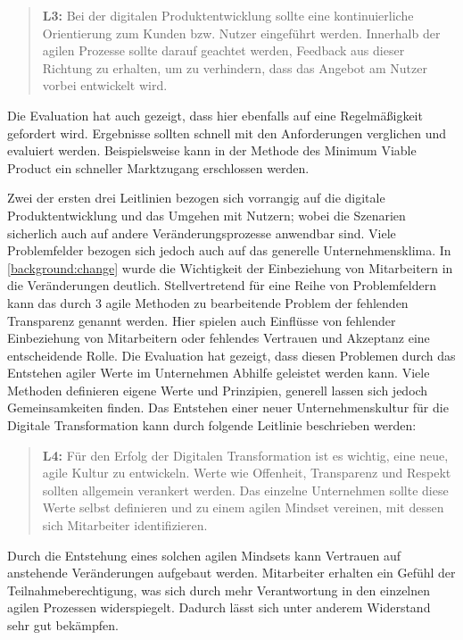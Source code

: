 \begin{quote}
	\textbf{L3:} Bei der digitalen Produktentwicklung sollte eine kontinuierliche Orientierung zum Kunden bzw. Nutzer eingeführt werden. Innerhalb der agilen Prozesse sollte darauf geachtet werden, Feedback aus dieser Richtung zu erhalten, um zu verhindern, dass das Angebot am Nutzer vorbei entwickelt wird.
\end{quote}

Die Evaluation hat auch gezeigt, dass hier ebenfalls auf eine Regelmäßigkeit gefordert wird. Ergebnisse sollten schnell mit den Anforderungen verglichen und evaluiert werden. Beispielsweise kann in der Methode des Minimum Viable Product ein schneller Marktzugang erschlossen werden.

Zwei der ersten drei Leitlinien bezogen sich vorrangig auf die digitale Produktentwicklung und das Umgehen mit Nutzern; wobei die Szenarien sicherlich auch auf andere Veränderungsprozesse anwendbar sind. Viele Problemfelder bezogen sich jedoch auch auf das generelle Unternehmensklima. In \ref{background:change} wurde die Wichtigkeit der Einbeziehung von Mitarbeitern in die Veränderungen deutlich. Stellvertretend für eine Reihe von Problemfeldern kann das durch 3 agile Methoden zu bearbeitende Problem der fehlenden Transparenz genannt werden. Hier spielen auch Einflüsse von fehlender Einbeziehung von Mitarbeitern oder fehlendes Vertrauen und Akzeptanz eine entscheidende Rolle. Die Evaluation hat gezeigt, dass diesen Problemen durch das Entstehen agiler Werte im Unternehmen Abhilfe geleistet werden kann. Viele Methoden definieren eigene Werte und Prinzipien, generell lassen sich jedoch Gemeinsamkeiten finden. Das Entstehen einer neuer Unternehmenskultur für die Digitale Transformation kann durch folgende Leitlinie beschrieben werden:

\begin{quote}
	\textbf{L4:} Für den Erfolg der Digitalen Transformation ist es wichtig, eine neue, agile Kultur zu entwickeln. Werte wie Offenheit, Transparenz und Respekt sollten allgemein verankert werden. Das einzelne Unternehmen sollte diese Werte selbst definieren und zu einem agilen Mindset vereinen, mit dessen sich Mitarbeiter identifizieren.
\end{quote}

Durch die Entstehung eines solchen agilen Mindsets kann Vertrauen auf anstehende Veränderungen aufgebaut werden. Mitarbeiter erhalten ein Gefühl der Teilnahmeberechtigung, was sich durch mehr Verantwortung in den einzelnen agilen Prozessen widerspiegelt. Dadurch lässt sich unter anderem Widerstand sehr gut bekämpfen.

